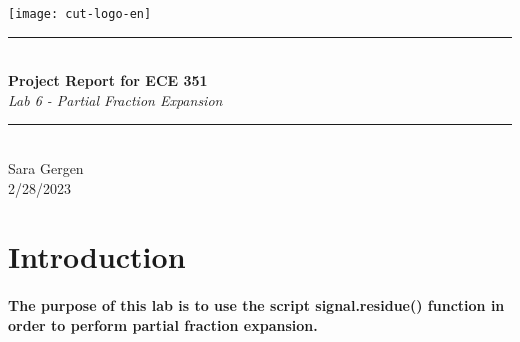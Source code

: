 \documentclass[12pt,a4paper]{article}
\newcommand{\HRule}{\rule{\linewidth}{0.5mm}}
\begin{document}
\begin{titlepage}
\begin{center}

\texttt{[image: cut-logo-en]}~\\[2cm]


\HRule \\[0.4cm]
{ \LARGE 
  \textbf{Project Report for ECE 351}\\[0.4cm]
  \emph{Lab 6 - Partial Fraction Expansion}\\[0.4cm]
}
\HRule \\[1.5cm]



{ \large
  Sara Gergen \\[0.1cm]
  2/28/2023\\[0.1cm]
}

\vfill



\end{center}
\end{titlepage}


\newpage



\tableofcontents
{}
\newpage
\setcounter{page}{1}

\section{Introduction}\label{sec:intro}


\paragraph{The purpose of this lab is to use the script signal.residue() function in order to perform partial fraction expansion.}
\end{document}
